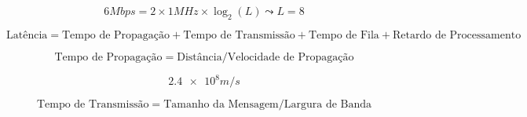 \documentclass{minimal}
\begin{document}
\[6 \unit{Mbps} = 2 \times 1 \unit{MHz} \times \log_2(L) \leadsto L = 8 \]


\[\text{Latência} = \text{Tempo de Propagação} + \text{Tempo de Transmissão}
+ \text{Tempo de Fila} + \text{Retardo de Processamento}\]

\[\text{Tempo de Propagação} = \text{Distância} / \text{Velocidade de Propagação}\]

\[\num{2,4e8} \unit{m/s}\]

\[\text{Tempo de Transmissão} = \text{Tamanho da Mensagem} / \text{Largura de Banda}\]
\begin{align*}
\end{align*}

\begin{align*}
\end{align*}

\begin{align*}
\end{align*}

\begin{align*}
\end{align*}
\end{document}
